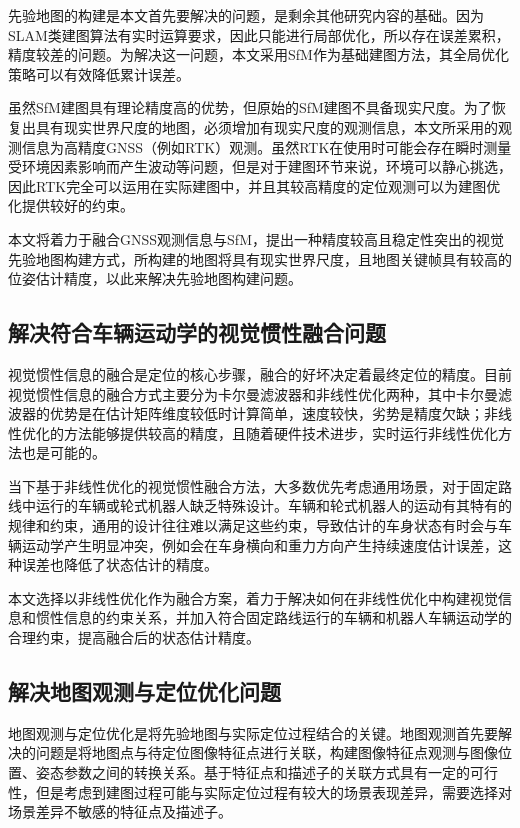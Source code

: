先验地图的构建是本文首先要解决的问题，是剩余其他研究内容的基础。因为SLAM类建图算法有实时运算要求，因此只能进行局部优化，所以存在误差累积，精度较差的问题。为解决这一问题，本文采用SfM作为基础建图方法，其全局优化策略可以有效降低累计误差。

虽然SfM建图具有理论精度高的优势，但原始的SfM建图不具备现实尺度。为了恢复出具有现实世界尺度的地图，必须增加有现实尺度的观测信息，本文所采用的观测信息为高精度GNSS（例如RTK）观测。虽然RTK在使用时可能会存在瞬时测量受环境因素影响而产生波动等问题，但是对于建图环节来说，环境可以静心挑选，因此RTK完全可以运用在实际建图中，并且其较高精度的定位观测可以为建图优化提供较好的约束。

本文将着力于融合GNSS观测信息与SfM，提出一种精度较高且稳定性突出的视觉先验地图构建方式，所构建的地图将具有现实世界尺度，且地图关键帧具有较高的位姿估计精度，以此来解决先验地图构建问题。

\subsection{解决符合车辆运动学的视觉惯性融合问题}

视觉惯性信息的融合是定位的核心步骤，融合的好坏决定着最终定位的精度。目前视觉惯性信息的融合方式主要分为卡尔曼滤波器和非线性优化两种，其中卡尔曼滤波器的优势是在估计矩阵维度较低时计算简单，速度较快，劣势是精度欠缺；非线性优化的方法能够提供较高的精度，且随着硬件技术进步，实时运行非线性优化方法也是可能的。

当下基于非线性优化的视觉惯性融合方法，大多数优先考虑通用场景，对于固定路线中运行的车辆或轮式机器人缺乏特殊设计。车辆和轮式机器人的运动有其特有的规律和约束，通用的设计往往难以满足这些约束，导致估计的车身状态有时会与车辆运动学产生明显冲突，例如会在车身横向和重力方向产生持续速度估计误差，这种误差也降低了状态估计的精度。

本文选择以非线性优化作为融合方案，着力于解决如何在非线性优化中构建视觉信息和惯性信息的约束关系，并加入符合固定路线运行的车辆和机器人车辆运动学的合理约束，提高融合后的状态估计精度。

\subsection{解决地图观测与定位优化问题}

地图观测与定位优化是将先验地图与实际定位过程结合的关键。地图观测首先要解决的问题是将地图点与待定位图像特征点进行关联，构建图像特征点观测与图像位置、姿态参数之间的转换关系。基于特征点和描述子的关联方式具有一定的可行性，但是考虑到建图过程可能与实际定位过程有较大的场景表现差异，需要选择对场景差异不敏感的特征点及描述子。

